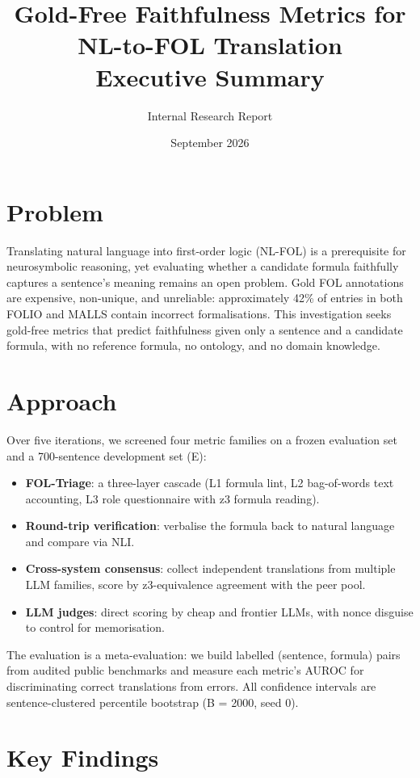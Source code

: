 \documentclass[11pt,letterpaper]{article}
\title{Gold-Free Faithfulness Metrics for NL-to-FOL Translation\\[0.5em]\large Executive Summary}
\author{Internal Research Report}
\date{September 2026}
\begin{document}
\maketitle

\section{Problem}

Translating natural language into first-order logic (NL-FOL) is a prerequisite for neurosymbolic reasoning, yet evaluating whether a candidate formula faithfully captures a sentence's meaning remains an open problem. Gold FOL annotations are expensive, non-unique, and unreliable: approximately 42\% of entries in both FOLIO and MALLS contain incorrect formalisations. This investigation seeks gold-free metrics that predict faithfulness given only a sentence and a candidate formula, with no reference formula, no ontology, and no domain knowledge.

\section{Approach}

Over five iterations, we screened four metric families on a frozen evaluation set and a 700-sentence development set (E):

\begin{itemize}[nosep]
\item \textbf{FOL-Triage}: a three-layer cascade (L1 formula lint, L2 bag-of-words text accounting, L3 role questionnaire with z3 formula reading).
\item \textbf{Round-trip verification}: verbalise the formula back to natural language and compare via NLI.
\item \textbf{Cross-system consensus}: collect independent translations from multiple LLM families, score by z3-equivalence agreement with the peer pool.
\item \textbf{LLM judges}: direct scoring by cheap and frontier LLMs, with nonce disguise to control for memorisation.
\end{itemize}

The evaluation is a meta-evaluation: we build labelled (sentence, formula) pairs from audited public benchmarks and measure each metric's AUROC for discriminating correct translations from errors. All confidence intervals are sentence-clustered percentile bootstrap (B = 2000, seed 0).

\section{Key Findings}
\end{document}
